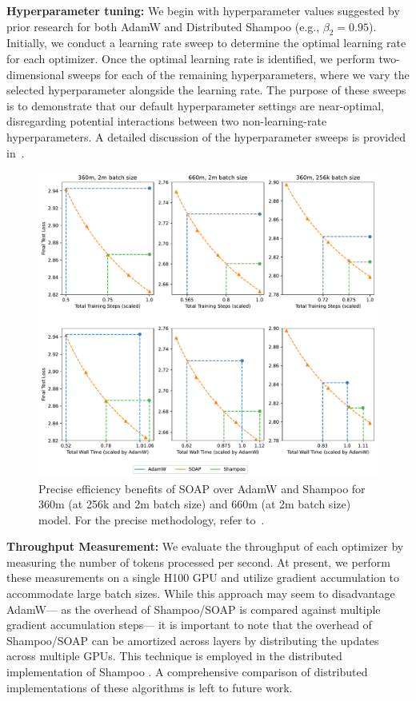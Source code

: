 \documentclass{article} %
\begin{document}
\textbf{Hyperparameter tuning:} We begin with hyperparameter values suggested by prior research for both AdamW and Distributed Shampoo (e.g., $\beta_2 = 0.95$). Initially, we conduct a learning rate sweep to determine the optimal learning rate for each optimizer. Once the optimal learning rate is identified, we perform two-dimensional sweeps for each of the remaining hyperparameters, where we vary the selected hyperparameter alongside the learning rate. The purpose of these sweeps is to demonstrate that our default hyperparameter settings are near-optimal, disregarding potential interactions between two non-learning-rate hyperparameters. A detailed discussion of the hyperparameter sweeps is provided in~.
\begin{figure}[ht]
	\centering
	\includegraphics[width=1\linewidth]{figures/main_fig_precise_overhead.pdf}
	\caption{Precise efficiency benefits of SOAP over AdamW and Shampoo for 360m (at 256k and 2m batch size) and 660m (at 2m batch size) model. For the precise methodology, refer to~.}
	\label{fig:prec_overhead}
\end{figure}


\textbf{Throughput Measurement:} We evaluate the throughput of each optimizer by measuring the number of tokens processed per second. At present, we perform these measurements on a single H100 GPU and utilize gradient accumulation to accommodate large batch sizes. While this approach may seem to disadvantage AdamW--- as the overhead of Shampoo/SOAP is compared against multiple gradient accumulation steps--- it is important to note that the overhead of Shampoo/SOAP can be amortized across layers by distributing the updates across multiple GPUs. This technique is employed in the distributed implementation of Shampoo \citep{distributedshampoo}. A comprehensive comparison of distributed implementations of these algorithms is left to future work.
\end{document}
